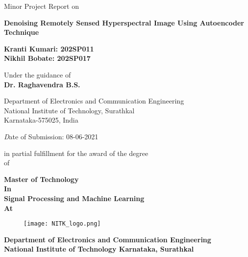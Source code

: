 \documentclass{article}
\title{}
\author{}
\date{}
\begin{document}
\begin{center}
Minor Project Report on 
\end{center}

\begin{center}
\textbf{\huge Denoising Remotely Sensed Hyperspectral Image Using Autoencoder Technique}
\end{center}

\begin{center}
\textbf{\large Kranti Kumari: 202SP011\\ Nikhil Bobate: 202SP017}
\end{center}

\begin{center}
Under the guidance of \\ {\textbf{\large Dr. Raghavendra B.S.}}
\end{center}

\begin{center}
\large Department of Electronics and Communication Engineering\\ National Institute of Technology, Surathkal\\  Karnataka-575025, India
\end{center}

\begin{center}
\emph Date of Submission: 08-06-2021
\end{center}

\begin{center}
in partial fulfillment for the award of the degree\\ of
\end{center}

\begin{center}
\textbf{\large Master of Technology\\ In\\ Signal Processing and Machine Learning\\ At}
\end{center}

\begin{figure}[htp]
    \centering
    \Large\texttt{[image: NITK\_logo.png]}
    \label{fig:logo1}
\end{figure}

\begin{center}
\textbf{\large Department of Electronics and Communication Engineering\\
National Institute of Technology Karnataka, Surathkal}
\end{center}
\end{document}
